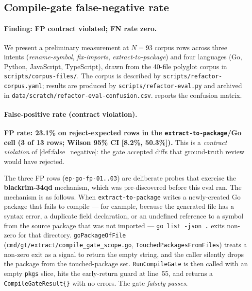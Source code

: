 \subsection{Compile-gate false-negative rate}
\label{sec:eval:gate}

\paragraph{Finding: FP contract violated; FN rate zero.}
We present a preliminary measurement at $N{=}93$ corpus rows across
three intents (\emph{rename-symbol}, \emph{fix-imports},
\emph{extract-to-package}) and four languages (Go, Python, JavaScript,
TypeScript), drawn from the 40-file polyglot corpus in
\texttt{scripts/corpus-files/}.
The corpus is described by \texttt{scripts/refactor-corpus.yaml};
results are produced by \texttt{scripts/refactor-eval.py} and archived
in \texttt{data/scratch/refactor-eval-confusion.csv}.
 reports the confusion matrix.

\paragraph{False-positive rate (contract violation).}
\textbf{FP rate: 23.1\% on reject-expected rows in the
\texttt{extract-to-package}/Go cell (3 of 13 rows; Wilson 95\% CI
[8.2\%, 50.3\%]).}
This is a \emph{contract violation} of \cref{def:false_negative}:
the gate accepted diffs that ground-truth review would have rejected.

The three FP rows (\texttt{ep-go-fp-01..03}) are deliberate probes
that exercise the \textbf{blackrim-34qd} mechanism, which was
pre-discovered before this eval ran.  The mechanism is as follows.
When \texttt{extract-to-package} writes a newly-created Go package
that fails to compile --- for example, because the generated file has
a syntax error, a duplicate field declaration, or an undefined
reference to a symbol from the source package that was not imported ---
\texttt{go list -json .} exits non-zero for that directory.
\texttt{goPackageOfFile} (\texttt{cmd/gt/extract/compile\_gate\_scope.go},
\texttt{TouchedPackagesFromFiles}) treats a non-zero exit as a signal
to return the empty string, and the caller silently drops the package
from the touched-package set.  \texttt{RunCompileGate} is then called
with an empty \texttt{pkgs} slice, hits the early-return guard at
line~55, and returns a \texttt{CompileGateResult\{\}} with no errors.
The gate \emph{falsely passes}.

